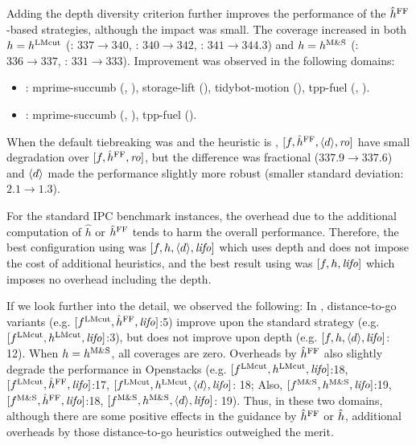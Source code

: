 Adding the depth diversity criterion further improves the performance of the $\hat{h}^{\text{FF}}$-based strategies,
 although the impact was small.
The coverage increased in both
 $h=h^\text{LMcut}$ (\fifo: $337\rightarrow 340$, \lifo: $340\rightarrow 342$, \ro: $341\rightarrow 344.3$) and
 $h=h^\text{M\&S}$ (\fifo: $336\rightarrow 337$, \lifo: $331\rightarrow 333$).
Improvement was observed in the following domains:
\begin{itemize}
 \item \textbf{\lmcut}: mprime-succumb (\lifo, \ro), storage-lift (\ro), tidybot-motion (\fifo), tpp-fuel (\fifo, \ro).
 \item \textbf{\mands}: mprime-succumb (\lifo, \ro), tpp-fuel (\fifo).
\end{itemize}
When the default tiebreaking was \ro and the heuristic is \mands, $[f,\hat{h}^{\text{FF}},{\left<d\right>},{\text{\textit{ro}}}]$ have small degradation
over $[f,\hat{h}^{\text{FF}},{\text{\textit{ro}}}]$, but the difference was fractional ($337.9\rightarrow 337.6$) and ${\left<d\right>}$ made the performance slightly more robust (smaller standard deviation: $2.1\rightarrow 1.3$).

For the standard IPC benchmark instances, the overhead due to the additional computation of
$\hat{h}$ or $\hat{h}^{\text{FF}}$ tends to harm the overall performance.
Therefore, the best configuration using \lmcut was
$[f,h,{\left<d\right>},{\text{\textit{lifo}}}]$ which uses depth and does not impose the cost of
additional heuristics, and the best result using \mands
was $[f,h,{\text{\textit{lifo}}}]$ which imposes no overhead including the depth.

If we look further into the detail, we observed the following:
In , distance-to-go variants (e.g. $[f^\text{LMcut},\hat{h}^{\text{FF}},{\text{\textit{lifo}}}]$:5) improve upon the standard strategy (e.g. $[f^\text{LMcut},h^\text{LMcut},{\text{\textit{lifo}}}]$:3), but does not improve upon depth (e.g. $[f,h,{\left<d\right>},{\text{\textit{lifo}}}]$: 12). When $h=h^\text{M\&S}$, all coverages are zero. Overheads by $\hat{h}^{\text{FF}}$ also slightly degrade the performance in Openstacks (e.g. $[f^\text{LMcut},h^\text{LMcut},{\text{\textit{lifo}}}]$:18, $[f^\text{LMcut},\hat{h}^{\text{FF}},{\text{\textit{lifo}}}]$:17, $[f^\text{LMcut},h^\text{LMcut},{\left<d\right>},{\text{\textit{lifo}}}]$: 18; Also, $[f^\text{M\&S},h^\text{M\&S},{\text{\textit{lifo}}}]$:19, $[f^\text{M\&S},\hat{h}^{\text{FF}},{\text{\textit{lifo}}}]$:18, $[f^\text{M\&S},h^\text{M\&S},{\left<d\right>},{\text{\textit{lifo}}}]$: 19). Thus, in these two domains, although there are some positive effects in the guidance by $\hat{h}^{\text{FF}}$ or $\hat{h}$, additional overheads by those distance-to-go heuristics outweighed the merit.
 
